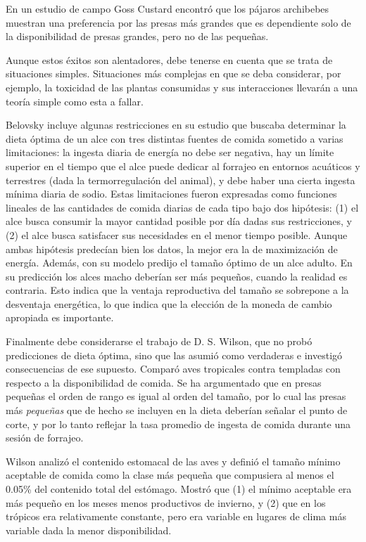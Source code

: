 \documentclass[a4paper,12pt]{article}
\begin{document}
En un estudio de campo Goss Custard encontró que los pájaros archibebes muestran una preferencia por las presas más grandes que es dependiente solo de la disponibilidad de presas grandes, pero no de las pequeñas.

Aunque estos éxitos son alentadores, debe tenerse en cuenta que se trata de situaciones simples. Situaciones más complejas en que se deba considerar, por ejemplo, la toxicidad de las plantas consumidas y sus interacciones llevarán a una teoría simple como esta a fallar.

Belovsky incluye algunas restricciones en su estudio que buscaba determinar la dieta óptima de un alce con tres distintas fuentes de comida sometido a varias limitaciones: la ingesta diaria de energía no debe ser negativa, hay un límite superior en el tiempo que el alce puede dedicar al forrajeo en entornos acuáticos y terrestres (dada la termorregulación del animal), y debe haber una cierta ingesta mínima diaria de sodio. Estas limitaciones fueron expresadas como funciones lineales de las cantidades de comida diarias de cada tipo bajo dos hipótesis: (1) el alce busca consumir la mayor cantidad posible por día dadas sus restricciones, y (2) el alce busca satisfacer sus necesidades en el menor tiempo posible. Aunque ambas hipótesis predecían bien los datos, la mejor era la de maximización de energía. Además, con su modelo predijo el tamaño óptimo de un alce adulto. En su predicción los alces macho deberían ser más pequeños, cuando la realidad es contraria. Esto indica que la ventaja reproductiva del tamaño se sobrepone a la desventaja energética, lo que indica que la elección de la moneda de cambio apropiada es importante.

Finalmente debe considerarse el trabajo de D. S. Wilson, que no probó predicciones de dieta óptima, sino que las asumió como verdaderas e investigó consecuencias de ese supuesto. Comparó aves tropicales contra templadas con respecto a la disponibilidad de comida. Se ha argumentado que en presas pequeñas el orden de rango es igual al orden del tamaño, por lo cual las presas más {\itshape pequeñas} que de hecho se incluyen en la dieta deberían señalar el punto de corte, y por lo tanto reflejar la tasa promedio de ingesta de comida durante una sesión de forrajeo.

Wilson analizó el contenido estomacal de las aves y definió el tamaño mínimo aceptable de comida como la clase más pequeña que compusiera al menos el 0.05\% del contenido total del estómago. Mostró que (1) el mínimo aceptable era más pequeño en los meses menos productivos de invierno, y (2) que en los trópicos era relativamente constante, pero era variable en lugares de clima más variable dada la menor disponibilidad.
\end{document}
